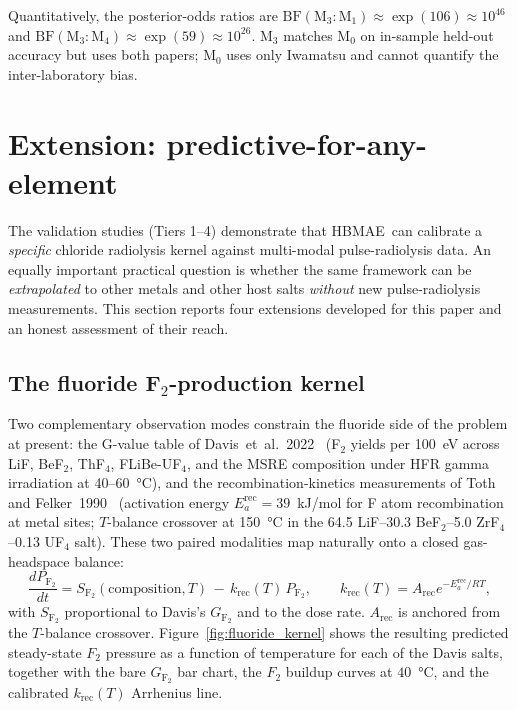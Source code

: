 \documentclass[12pt]{article}
\theoremstyle{plain}
\theoremstyle{definition}
\theoremstyle{remark}
\newcommand{\HBMAE}{HBMAE\xspace}
\begin{document}
Quantitatively, the posterior-odds ratios are
$\mathrm{BF}(\mathrm{M_3}:\mathrm{M_1}) \approx \exp(106)\approx 10^{46}$ and
$\mathrm{BF}(\mathrm{M_3}:\mathrm{M_4}) \approx \exp(59)\approx 10^{26}$.
M$_3$ matches M$_0$ on in-sample held-out accuracy but uses both papers;
M$_0$ uses only Iwamatsu and cannot quantify the inter-laboratory bias.

\section{Extension: predictive-for-any-element}\label{sec:predictive}

The validation studies (Tiers 1--4) demonstrate that \HBMAE\ can calibrate a
\emph{specific} chloride radiolysis kernel against multi-modal pulse-radiolysis
data.  An equally important practical question is whether the same framework
can be \emph{extrapolated} to other metals and other host salts \emph{without}
new pulse-radiolysis measurements.  This section reports four extensions
developed for this paper and an honest assessment of their reach.

\subsection{The fluoride F$_2$-production kernel}\label{sec:pred:fluoride}

Two complementary observation modes constrain the fluoride side of the
problem at present:  the G-value table of Davis~et~al.~2022~\citep{Davis2022}
(F$_2$ yields per 100~eV across LiF, BeF$_2$, ThF$_4$, FLiBe-UF$_4$, and the
MSRE composition under HFR gamma irradiation at 40--60~\si{\celsius}), and
the recombination-kinetics measurements of
Toth and Felker~1990~\citep{Toth1990} (activation energy $E_a^{\mathrm{rec}}
= 39$~kJ/mol for F atom recombination at metal sites; $T$-balance crossover
at 150~\si{\celsius} in the 64.5 LiF--30.3 BeF$_2$--5.0 ZrF$_4$--0.13 UF$_4$
salt).  These two paired modalities map naturally onto a closed gas-headspace
balance:
%
\begin{equation}
  \frac{dP_{\mathrm{F_2}}}{dt}
  = S_{\mathrm{F_2}}(\text{composition}, T)
  \,-\, k_{\mathrm{rec}}(T)\,P_{\mathrm{F_2}},
  \qquad
  k_{\mathrm{rec}}(T) = A_{\mathrm{rec}} e^{-E_a^{\mathrm{rec}}/RT},
\end{equation}
%
with $S_{\mathrm{F_2}}$ proportional to Davis's $G_{\mathrm{F_2}}$ and to the
dose rate.  $A_{\mathrm{rec}}$ is anchored from the
$T$-balance crossover.  Figure~\ref{fig:fluoride_kernel} shows the resulting
predicted steady-state $F_2$ pressure as a function of temperature for each
of the Davis salts, together with the bare $G_{\mathrm{F_2}}$ bar chart, the
$F_2$ buildup curves at $40$~\si{\celsius}, and the calibrated
$k_{\mathrm{rec}}(T)$ Arrhenius line.
\end{document}
